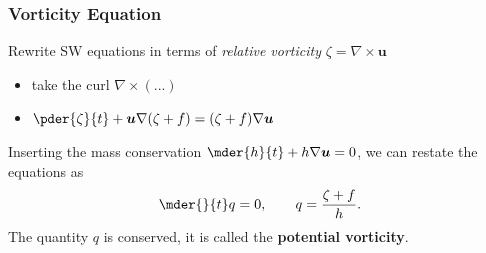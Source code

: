 \documentclass[12pt]{beamer}
\begin{document}
%
%
%
\begin{frame}
\frametitle{Vorticity Equation}
Rewrite SW equations in terms of \textit{relative vorticity} $\zeta=\nabla\times\bm{u}$
\vspace{0.3cm}
\begin{itemize}
	\item take the curl $\nabla \times \left(...\right)$
	\item $\pder{\zeta}{t}+\bm{u}\nabla(\zeta+f)=(\zeta+f)\nabla \bm{u}$
\end{itemize}
\vspace{0.5cm}
Inserting the mass conservation $\mder{h}{t}+h\nabla\bm{u}=0$, we can restate the equations as
\begin{align}
\mder{}{t}q=0,\qquad q=\frac{\zeta+f}{h}\label{pv_conservation}.
\end{align}
\vspace{0.5cm}
The quantity $q$ is conserved, it is called the \textbf{potential vorticity}. 
\end{frame}
\end{document}
